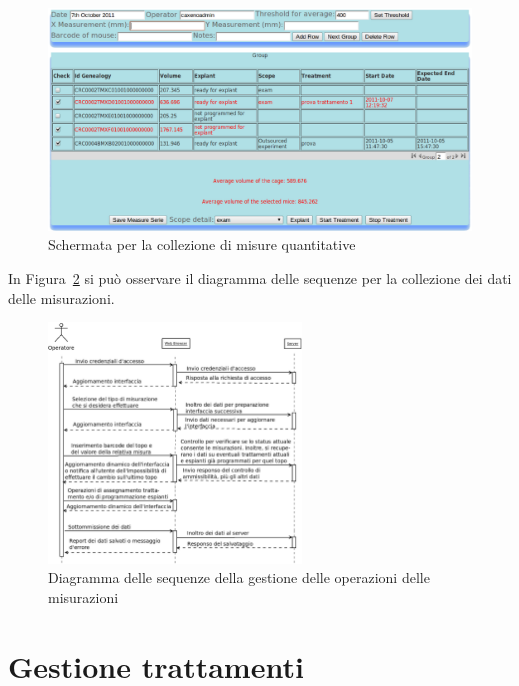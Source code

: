 \begin{figure}[h]
\begin{center}
\includegraphics[width=1.0\textwidth]{./Figure/quantMeasure}
\end{center}
\caption{Schermata per la collezione di misure quantitative\label{fig:qm}}
\end{figure}

In Figura~\ref{fig:SDmeasure} si pu\`o osservare il diagramma delle sequenze per la collezione dei dati delle misurazioni.

\begin{figure}[h]
\begin{center}
\includegraphics[width=0.6\textwidth]{./Figure/SDmeasurements}
\end{center}
\caption{Diagramma delle sequenze della gestione delle operazioni delle misurazioni\label{fig:SDmeasure}}
\end{figure}

\newpage

\section{Gestione trattamenti}\label{sec:tratt}


